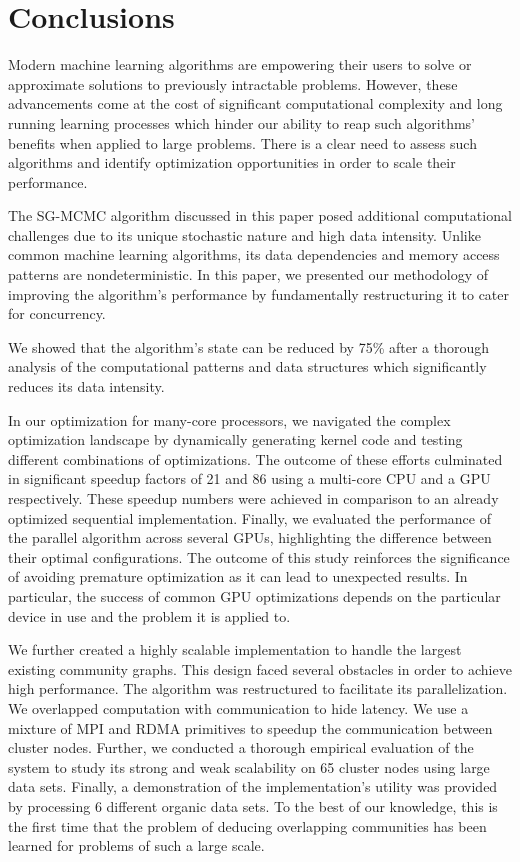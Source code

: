 \section{Conclusions}
\label{sec-conclusion}

Modern machine learning algorithms are empowering their
users to solve or approximate solutions to previously intractable problems.
However, these advancements come at the cost of significant computational
complexity and long running learning processes which hinder our ability to reap
such algorithms' benefits when applied to large problems. There is a clear need
to assess such algorithms and identify optimization opportunities in order to
scale their performance.

The SG-MCMC algorithm discussed in this paper posed additional computational
challenges due to its unique stochastic nature and high data intensity. Unlike
common machine learning algorithms, its data dependencies and memory access
patterns are nondeterministic. In this paper, we presented our methodology of
improving the algorithm's performance by fundamentally restructuring it to
cater for concurrency.

We showed that the algorithm's state can be reduced by 75\% after a thorough
analysis of the computational patterns and data structures which significantly
reduces its data intensity.

In our optimization for many-core processors, we navigated the complex optimization
landscape by dynamically generating kernel code and testing different
combinations of optimizations. The outcome of these efforts culminated in
significant speedup factors of 21 and 86 using a multi-core CPU and a GPU
respectively. These speedup numbers were achieved in comparison to an already
optimized sequential implementation. Finally, we evaluated the performance of
the parallel algorithm across several GPUs, highlighting the difference between
their optimal configurations.
%
The outcome of this study reinforces the significance of avoiding premature
optimization as it can lead to unexpected results. In particular, the success
of common GPU optimizations depends on the particular device in use and the
problem it is applied to.

We further created a highly scalable implementation to handle the largest existing
community graphs.
This design faced
several obstacles in order to achieve high performance.
The algorithm was restructured to facilitate its
parallelization. We overlapped computation
with communication to hide latency.  We use a
mixture of MPI and RDMA primitives to speedup the communication between cluster
nodes.
%
Further, we conducted a thorough empirical evaluation of the system to study its strong
and weak scalability on 65 cluster nodes using large data sets.
Finally, a
demonstration of the implementation's utility was provided by processing 6
different organic data sets.
To the best of
our knowledge, this is the first time that the problem of deducing overlapping
communities has been learned for problems of such a large scale.
